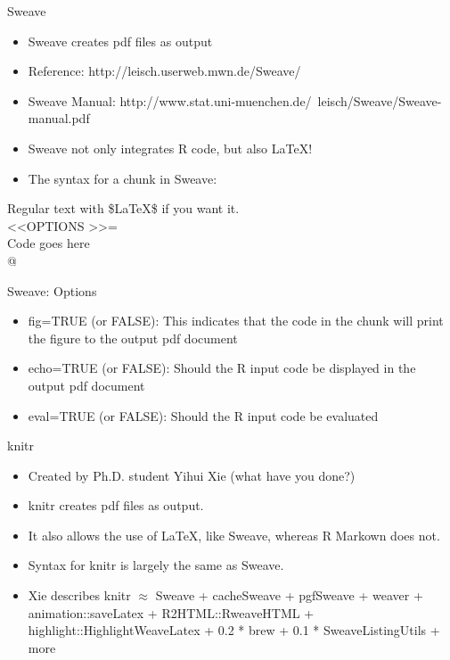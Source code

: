 \documentclass[table]{beamer}\usepackage[]{graphicx}\usepackage[]{color}
\begin{document}
\begin{frame}{Sweave}
\begin{itemize}
\item Sweave creates pdf files as output
\item Reference: http://leisch.userweb.mwn.de/Sweave/
\item Sweave Manual: http://www.stat.uni-muenchen.de/~leisch/Sweave/Sweave-manual.pdf
\item Sweave not only integrates R code, but also LaTeX!
\item The syntax for a chunk in Sweave:
\end{itemize}
Regular text with \$LaTeX\$ if you want it.\\
\textless\textless OPTIONS \textgreater\textgreater=\\
Code goes here\\
@\\
\end{frame}

\begin{frame}{Sweave: Options}
\begin{itemize}
\item fig=TRUE (or FALSE): This indicates that the code in the chunk will print the figure to the output pdf document
\item echo=TRUE (or FALSE): Should the R input code be displayed in the output pdf document
\item eval=TRUE (or FALSE): Should the R input code be evaluated
\end{itemize}
\end{frame}



\begin{frame}{knitr}
\begin{itemize}
\item Created by Ph.D. student Yihui Xie (what have you done?) 
\item knitr creates pdf files as output.
\item It also allows the use of LaTeX, like Sweave, whereas R Markown does not.  
\item Syntax for knitr is largely the same as Sweave.
\item Xie describes knitr $\approx$ Sweave + cacheSweave + pgfSweave + weaver + animation::saveLatex + R2HTML::RweaveHTML + highlight::HighlightWeaveLatex + 0.2 * brew + 0.1 * SweaveListingUtils + more
\end{itemize}
\end{frame}
\end{document}
